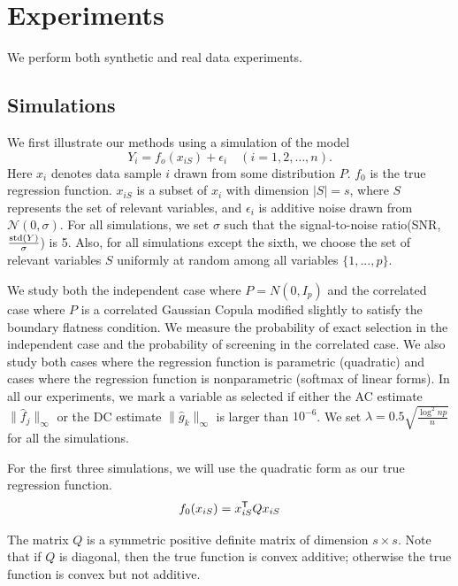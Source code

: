 \def\x{x}
\def\Q{Q}
\def\bds#1{#1}
\def\tts#1{\texttt{\small #1}}

\section{Experiments}
\label{sec:thesims}

We perform both synthetic and real data experiments.

\subsection{Simulations}
We first illustrate our methods using a simulation of the model
\begin{equation}\nonumber
         Y_i = f_o(\x_{iS}) + \epsilon_i \quad (i=1,2,\ldots,n).
\end{equation}
Here $\x_{i}$ denotes data sample $i$ drawn from some distribution $P$. $f_0$ is the true regression function. $\x_{iS}$ is a subset of $\x_i$ with dimension $|S|=s$, where $S$
represents the set of relevant variables, and 
$\epsilon_i$ is additive noise drawn from $\mathcal{N}(0,\sigma)$. For 
all simulations, we set $\sigma$ such that the signal-to-noise ratio(SNR, $\frac{\textrm{std}(Y)}{\sigma}$) is 5. Also, for all simulations except the sixth, we choose the set of relevant variables $S$ uniformly at random among all variables $\{1,...,p\}$.

We study both the independent case where $P = N(0, I_p)$ and the correlated case where $P$ is a correlated Gaussian Copula modified slightly to satisfy the boundary flatness condition. We measure the probability of exact selection in the independent case and the probability of screening in the correlated case. We also study both cases where the regression function is parametric (quadratic) and cases where the regression function is nonparametric (softmax of linear forms). In all our experiments, we mark a variable as selected if either the AC estimate $\| \hat{f}_j \|_\infty$ or the DC estimate $\| \hat{g}_k \|_\infty$ is larger than $10^{-6}$. We set $\lambda = 0.5 \sqrt{\frac{\log^2 np}{n}}$ for all the simulations.

For the first three simulations, we will use the quadratic form as our true regression function.
\[
f_0(x_{iS}) = x_{iS}^\tran \Q x_{iS}
\]

The matrix $\Q$ is a symmetric positive definite matrix of dimension $s \times{} s$. 
Note that if $\Q$ is diagonal, then the true function is convex
additive; 
otherwise the true function is convex but not additive.

